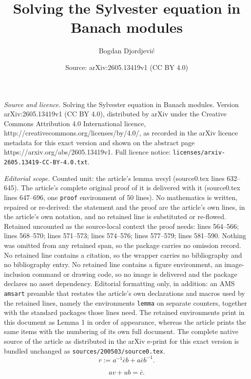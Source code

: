 \documentclass[10pt,a4paper]{amsart}
\title{Solving the Sylvester equation in Banach modules}
\author{Bogdan Djordjevi\'c}
\date{Source: arXiv:2605.13419v1 (CC BY 4.0)}
\begin{document}
\maketitle

\noindent\emph{Source and licence.} Solving the Sylvester equation in Banach modules. Version arXiv:2605.13419v1 (CC BY 4.0), distributed by arXiv under the Creative Commons Attribution 4.0 International licence, http://creativecommons.org/licenses/by/4.0/, as recorded in the arXiv licence metadata for this exact version and shown on the abstract page https://arxiv.org/abs/2605.13419v1. Full licence notice: \texttt{licenses/arxiv-2605.13419-CC-BY-4.0.txt}.\par\smallskip

\noindent\textit{Editorial scope.} Counted unit: the article's lemma uvsyl (source0.tex lines 632--645). The article's complete original proof of it is delivered with it (source0.tex lines 647--696, one \texttt{proof} environment of 50 lines). No mathematics is written, repaired or re-derived: the statement and the proof are the article's own lines, in the article's own notation, and no retained line is substituted or re-flowed.  Retained uncounted as the source-local context the proof needs: lines 564--566; lines 568--570; lines 571--573; lines 574--576; lines 577--579; lines 581--590.  Nothing was omitted from any retained span, so the package carries no omission record.  No retained line contains a citation, so the wrapper carries no bibliography and no bibliography entry.  No retained line contains a figure environment, an image-inclusion command or drawing code, so no image is delivered and the package declares no asset dependency.  Editorial formatting only, in addition: an AMS \texttt{amsart} preamble that restates the article's own declarations and macros used by the retained lines, namely the environments \texttt{lemma} on separate counters, together with the standard packages those lines need.  The retained environments print in this document as Lemma 1 in order of appearance, whereas the article prints the same items with the numbering of its own full document.  The complete native source of the article as distributed in the arXiv e-print for this exact version is bundled unchanged as \texttt{sources/200503/source0.tex}.
\begin{equation}\label{r}
r:=a^{-1}\bar{c}b+a\bar{c}b^{-1}.
\end{equation}

\begin{equation}\label{gensyl}
av+ub=\bar{c}.
\end{equation}
\end{document}
